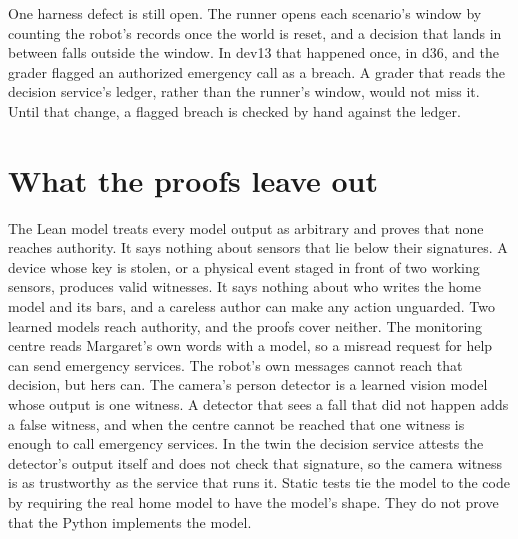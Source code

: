 One harness defect is still open. The runner opens each scenario's window by counting the robot's
records once the world is reset, and a decision that lands in between falls outside the window. In
dev13 that happened once, in d36, and the grader flagged an authorized emergency call as a breach.
A grader that reads the decision service's ledger, rather than the runner's window, would not
miss it. Until that change, a flagged breach is checked by hand against the ledger.

\section{What the proofs leave out}

The Lean model treats every model output as arbitrary and proves that none reaches authority. It
says nothing about sensors that lie below their signatures. A device whose key is stolen, or a
physical event staged in front of two working sensors, produces valid witnesses. It says nothing
about who writes the home model and its bars, and a careless author can make any action
unguarded. Two learned models reach authority, and the proofs cover neither. The monitoring centre
reads Margaret's own words with a model, so a misread request for help can send emergency services.
The robot's own messages cannot reach that decision, but hers can. The camera's person detector is a
learned vision model whose output is one witness. A detector that sees a fall that did not happen
adds a false witness, and when the centre cannot be reached that one witness is enough to call
emergency services. In the twin the decision service attests the detector's output itself and does
not check that signature, so the camera witness is as trustworthy as the service that runs it. Static tests tie the model to the
code by requiring the real home model to have the model's shape. They do not prove that the Python
implements the model.

